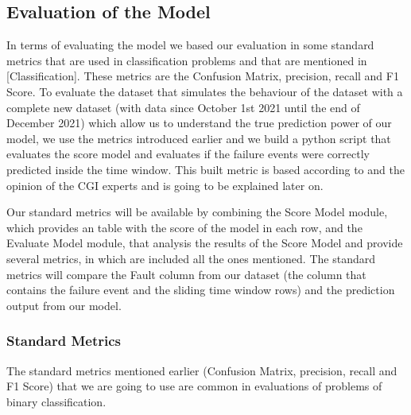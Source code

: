 \subsection{Evaluation of the Model}
In terms of evaluating the model we based our evaluation in some standard metrics that are used in classification problems and that are mentioned in \cite{41_WIND} \cite{N_4_WIND} \cite{MED_1} [Classification]. These metrics are the Confusion Matrix, precision, recall and F1 Score.
To evaluate the dataset that simulates the behaviour of the dataset with a complete new dataset (with data since October 1st 2021 until the end of December 2021) which allow us to understand the true prediction power of our model, we use the metrics introduced earlier and we build a python script that evaluates the score model and evaluates if the failure events were correctly predicted inside the time window. This built metric is based according to \cite{MED_1} and the opinion of the CGI experts and is going to be explained later on.

Our standard metrics will be available by combining the Score Model module, which provides an table with the score of the model in each row, and the Evaluate Model module, that analysis the results of the Score Model and provide several metrics, in which are included all the ones mentioned.
The standard metrics will compare the Fault column from our dataset (the column that contains the failure event and the sliding time window rows) and the prediction output from our model.

\subsubsection{Standard Metrics}
The standard metrics mentioned earlier (Confusion Matrix, precision, recall and F1 Score) that we are going to use are common in evaluations of problems of binary classification.

